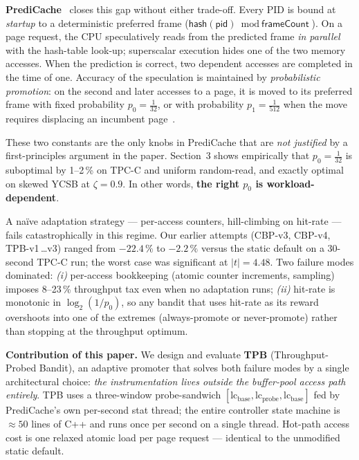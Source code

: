 \documentclass[10pt,twocolumn]{article}
\begin{document}
\textbf{PrediCache}~\cite{zinsmeister2026predictive} closes this gap without
either trade-off.  Every PID is bound at \emph{startup} to a deterministic
preferred frame ($\textsf{hash}(\textsf{pid}) \bmod \textsf{frameCount}$).
On a page request, the CPU speculatively reads from the predicted frame
\emph{in parallel} with the hash-table look-up; superscalar execution hides
one of the two memory accesses.  When the prediction is correct, two
dependent accesses are completed in the time of one.  Accuracy of the
speculation is maintained by \emph{probabilistic promotion}: on the second
and later accesses to a page, it is moved to its preferred frame with
fixed probability $p_0 = \tfrac{1}{32}$, or with probability
$p_1 = \tfrac{1}{512}$ when the move requires displacing an incumbent
page~\cite{zinsmeister2026predictive}.

These two constants are the only knobs in PrediCache that are
\emph{not justified} by a first-principles argument in the paper.  Section~3
shows empirically that $p_0\!=\!\tfrac{1}{32}$ is suboptimal by 1--2\,\%
on TPC-C and uniform random-read, and exactly optimal on
skewed YCSB at $\zeta\!=\!0.9$.  In other words,
\textbf{the right $p_0$ is workload-dependent}.

A naïve adaptation strategy --- per-access counters, hill-climbing on
hit-rate --- fails catastrophically in this regime.  Our earlier attempts
(CBP-v3, CBP-v4, TPB-v1\,\dots v3) ranged from $-22.4\,\%$ to $-2.2\,\%$
versus the static default on a 30-second TPC-C run; the worst case was
significant at $|t|\!=\!4.48$.  Two failure modes dominated: \emph{(i)}
per-access bookkeeping (atomic counter increments, sampling) imposes
8--23\,\% throughput tax even when no adaptation runs; \emph{(ii)} hit-rate
is monotonic in $\log_2(1/p_0)$, so any bandit that uses hit-rate as its
reward overshoots into one of the extremes (always-promote or
never-promote) rather than stopping at the throughput optimum.

\textbf{Contribution of this paper.}
We design and evaluate \textbf{TPB} (Throughput-Probed Bandit), an
adaptive promoter that solves both failure modes by a single architectural
choice: \emph{the instrumentation lives outside the buffer-pool access path
entirely}.  TPB uses a three-window probe-sandwich
$[\text{lc}_{\text{base}}, \text{lc}_{\text{probe}}, \text{lc}_{\text{base}}]$
fed by PrediCache's own per-second stat thread; the entire controller
state machine is $\approx 50$ lines of C++ and runs once per second on a
single thread.  Hot-path access cost is one relaxed atomic load per page
request --- identical to the unmodified static default.
\end{document}

